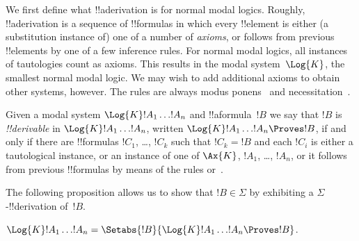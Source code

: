 \documentclass[../../../include/open-logic-section]{subfiles}
\begin{document}


We first define what !!a{derivation} is for normal modal
logics. Roughly, !!a{derivation} is a sequence of !!{formula}s in
which every !!{element} is either (a substitution instance of) one of
a number of \emph{axioms}, or follows from previous !!{element}s by
one of a few inference rules. For normal modal logics, all instances
of tautologies
count as axioms. This results in the modal system~$\Log{K}$, the
smallest normal modal logic. We may wish to add additional axioms to
obtain other systems, however. The rules are always modus ponens~\MP{}
and necessitation~\Nec.

\begin{defn}
  Given a modal system $\Log{K} !A_1 \dots !A_n$ and !!a{formula}~$!B$
  we say that $!B$ is \emph{!!{derivable}} in $\Log{K} !A_1 \dots
  !A_n$, written $\Log{K} !A_1 \dots !A_n \Proves !B$, if and only if
  there are !!{formula}s $!C_1$, \dots, $!C_k$ such that $!C_k = !B$
  and each $!C_i$ is either a tautological instance, or an instance of
  one of $\Ax{K}$, $!A_1$,
  \dots, $!A_n$, or it follows from previous !!{formula}s by means of
  the rules \MP{} or~\Nec.
\end{defn}

The following proposition allows us to show that $!B \in \Sigma$
by exhibiting a $\Sigma$-!!{derivation} of~$!B$.

\begin{prop}
  $\Log{K} !A_1 \dots !A_n = \Setabs{!B}{\Log{K} !A_1 \dots !A_n \Proves !B}$.
\end{prop}
\end{document}

